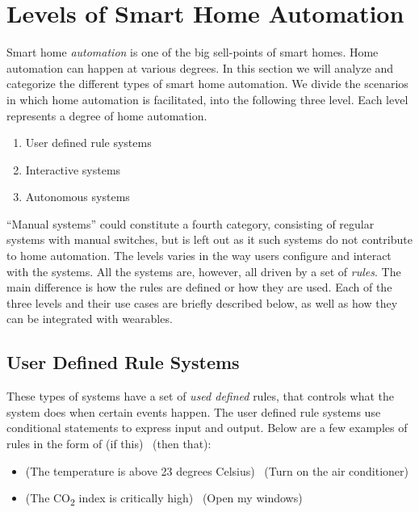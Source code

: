 \section{Levels of Smart Home Automation}\label{sec:system-categories}

Smart home \emph{automation} is one of the big sell-points of smart homes.
Home automation can happen at various degrees. 
In this section we will analyze and categorize the different types of smart home automation. 
We divide the scenarios in which home automation is facilitated, 
into the following three level. Each level represents a degree of home automation.

\begin{enumerate}
    \item User defined rule systems
    \item Interactive systems
    \item Autonomous systems
\end{enumerate}

``Manual systems'' could constitute a fourth category, 
consisting of regular systems with manual switches,
but is left out as it such systems do not contribute to home automation.
The levels varies in the way users configure and interact with the systems. 
All the systems are, however, all driven by a set of \emph{rules}. 
The main difference is how the rules are defined or how they are used.
Each of the three levels and their use cases are briefly described below,
as well as how they can be integrated with wearables.

\subsection{User Defined Rule Systems}

These types of systems have a set of \emph{used defined} rules, 
that controls what the system does when certain events happen. 
The user defined rule systems use conditional statements to express input and output. 
Below are a few examples of rules in the form of (if this) \textrightarrow~(then that):

\begin{itemize}
    \item (The temperature is above 23 degrees Celsius) \textrightarrow~(Turn on the air conditioner)
    \item (The CO\textsubscript{2} index is critically high) \textrightarrow~(Open my windows)
\end{itemize}


